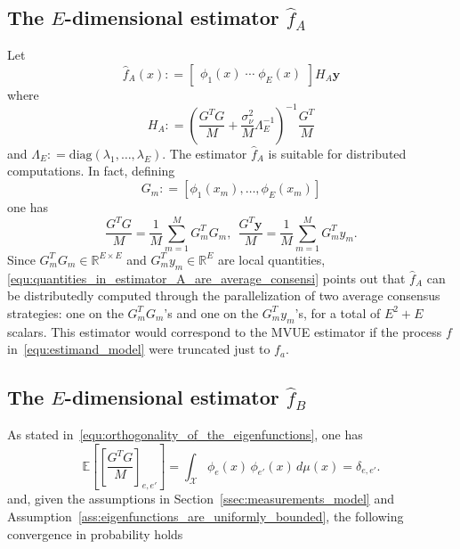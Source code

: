 \documentclass[10pt,twocolumn,twoside]{IEEEtran}					%
\theoremstyle	{plain}
\newcommand{\DiagonalMatrixOf}		[1]	{\mathrm{diag} \left( #1 \right)}
\newcommand{\DefinedAs}			[0]	{\mathrel{\mathop:}=}
\newcommand{\Reals}									[0]	{\mathbb{R}}
\newcommand{\Expectation}					[0]	{\mathbb{E}}
\newcommand{\ExpectationOf}					[1]	{\Expectation \left[ #1 \right]}
\newcommand	{\Assumption}			[0]	{Assumption}
\newcommand	{\Section}				[0]	{Section}
\begin{document}
\subsection{The $E$-dimensional estimator $\widehat{f}_{A}$}
\label{ssec:the_finite-dimensional_estimator_widehat_f_a}

Let
%
\begin{equation}
	\widehat{f}_{A}(x)
	\DefinedAs
	\begin{bmatrix}
		\phi_{1}(x) \; \cdots \; \phi_{E}(x)
	\end{bmatrix}
	H_{A}
	\bm{y}
	\label{equ:estimator_A}
\end{equation}
%
where
%
\begin{equation}
	H_{A}
	\DefinedAs
	\left( \frac{G^{T} G}{M} + \frac{\sigma^{2}_{\nu}}{M} \Lambda^{-1}_{E} \right)^{-1} \frac{G^{T}}{M} 
	\label{equ:definition_of_H_A}
\end{equation}
%
and $\Lambda_{E} \DefinedAs \DiagonalMatrixOf{\lambda_{1}, \ldots, \lambda_{E}}$. The estimator $\widehat{f}_{A}$ is suitable for distributed computations. In fact, defining
%
\begin{equation}
	G_{m}
	\DefinedAs
	\left[ \phi_{1}(x_{m}), \ldots, \phi_{E}(x_{m}) \right]
	\label{equ:definition_of_G_m}
\end{equation}
%
one has
%
\begin{equation}
	\frac{G^{T} G}{M}
	=
	\frac{1}{M}\sum_{m = 1}^{M} G_{m}^{T} G_{m},
	\ \
	\frac{G^{T} \bm{y}}{M}
	=
	\frac{1}{M} \sum_{m = 1}^{M} G_{m}^{T} y_{m} .
	\label{equ:quantities_in_estimator_A_are_average_consensi}
\end{equation}
%
Since $G_{m}^{T} G_{m} \in \Reals^{E \times E}$ and $G_{m}^{T} y_{m} \in \Reals^{E}$ are local quantities, \eqref{equ:quantities_in_estimator_A_are_average_consensi} points out that $\widehat{f}_{A}$ can be distributedly computed through the parallelization of two average consensus strategies: one on the $G_{m}^{T} G_{m}$'s and one on the $G_{m}^{T} y_{m}$'s, for a total of $E^{2} + E$ scalars. This estimator would correspond to the \ac{MVUE} estimator if the process $f$ in~\eqref{equ:estimand_model} were truncated just to $f_{a}$.


\subsection{The $E$-dimensional estimator $\widehat{f}_{B}$}
\label{ssec:the_e-dimensional_estimator_widehat_f_b}

As stated in~\eqref{equ:orthogonality_of_the_eigenfunctions}, one has
%
\begin{equation}
	\ExpectationOf{ \left[ \frac{G^{T} G}{M} \right]_{e, e'} } 
	=
	\int_{\mathcal{X}} \phi_{e}(x) \, \phi_{e'}(x) \, d \mu(x) 
	=
	\delta_{e, e'}.
\end{equation}
%
and, given the assumptions in \Section~\ref{ssec:measurements_model} and \Assumption~\ref{ass:eigenfunctions_are_uniformly_bounded}, 
the following convergence in probability holds
\end{document}

